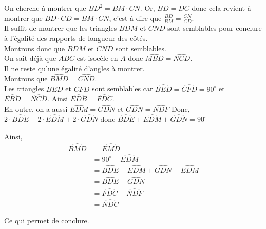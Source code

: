\begin{sol}
On cherche à montrer que $BD^2= BM \cdot CN$. Or, $BD = DC$ donc cela revient à montrer que $BD \cdot CD = BM \cdot CN$, c'est-à-dire que $\frac{BD}{BM} = \frac{CN}{CD}$.\\ Il suffit de montrer que les triangles $BDM$ et $CND$ sont semblables pour conclure à l'égalité des rapports de longueur des côtés. \\ Montrons donc que $BDM$ et $CND$ sont semblables. \\ On sait déjà que $ABC$ est isocèle en $A$ donc $\widehat{MBD} = \widehat{NCD}$. \\ Il ne reste qu'une égalité d'angles à montrer. \\ Montrons que $\widehat{BMD} = \widehat{CND}$. \\ Les triangles $BED$ et $CFD$ sont semblables car $\widehat{BED} = \widehat{CFD} =  90^\circ $ et $\widehat{EBD} = \widehat{NCD}$. Ainsi $\widehat{EDB} = \widehat{FDC}$. \\ En outre, on a aussi $\widehat{EDM} = \widehat{GDN}$ et $\widehat{GDN} = \widehat{NDF}$  Donc, $2 \cdot \widehat{BDE} + 2 \cdot \widehat{EDM} + 2 \cdot \widehat{GDN}$ donc $\widehat{BDE} + \widehat{EDM} + \widehat{GDN} =  90^\circ $

Ainsi, \begin{align*} 
\widehat{BMD} &= \widehat{EMD} \\ &=  90^\circ -\widehat{EDM} \\ &= \widehat{BDE} + \widehat{EDM} + \widehat{GDN} - \widehat{EDM} \\ &= \widehat{BDE} + \widehat{GDN} \\ &= \widehat{FDC} + \widehat{NDF} \\ &= \widehat{NDC} 
\end{align*}

Ce qui permet de conclure.
\end{sol}